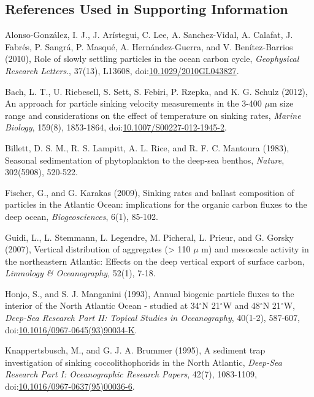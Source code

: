 \begin{singlespace}
\section*{References Used in Supporting Information}
\addtocounter{section}{1}
{\setlength{\parindent}{0pt}
Alonso-Gonz\'{a}lez, I. J., J. Ar\'{i}stegui, C. Lee, A. Sanchez-Vidal, A. Calafat, J. Fabr\'{e}s, P. Sangr\'{a}, P. Masqu\'{e}, A. Hern\'{a}ndez-Guerra, and V. Ben\'{i}tez-Barrios (2010), Role of slowly settling particles in the ocean carbon cycle, \emph{Geophysical Research Letters}., 37(13), L13608, doi:\href{http://dx.doi.org/10.1029/2010GL043827}{10.1029/2010GL043827}.

{\setlength{\parskip}{10pt}

Bach, L. T., U. Riebesell, S. Sett, S. Febiri, P. Rzepka, and K. G. Schulz (2012), An approach for particle sinking velocity measurements in the 3-400 $\mu$m size range and considerations on the effect of temperature on sinking rates, \emph{Marine Biology}, 159(8), 1853-1864, doi:\href{http://dx.doi.org/10.1007/S00227-012-1945-2}{10.1007/S00227-012-1945-2}.

Billett, D. S. M., R. S. Lampitt, A. L. Rice, and R. F. C. Mantoura (1983), Seasonal sedimentation of phytoplankton to the deep-sea benthos, \emph{Nature}, 302(5908), 520-522.

Fischer, G., and G. Karakas (2009), Sinking rates and ballast composition of particles in the Atlantic Ocean: implications for the organic carbon fluxes to the deep ocean, \emph{Biogeosciences}, 6(1), 85-102.

Guidi, L., L. Stemmann, L. Legendre, M. Picheral, L. Prieur, and G. Gorsky (2007), Vertical distribution of aggregates (\textgreater{} 110 $\mu$ m) and mesoscale activity in the northeastern Atlantic: Effects on the deep vertical export of surface carbon, \emph{Limnology \& Oceanography}, 52(1), 7-18.

Honjo, S., and S. J. Manganini (1993), Annual biogenic particle fluxes to the interior of the North Atlantic Ocean - studied at 34$^{\circ}$N 21$^{\circ}$W and 48$^{\circ}$N 21$^{\circ}$W, \emph{Deep-Sea Research Part II: Topical Studies in Oceanography}, 40(1-2), 587-607, doi:\href{http://dx.doi.org/10.1016/0967-0645(93)90034-K}{10.1016/0967-0645(93)90034-K}.

Knappertsbusch, M., and G. J. A. Brummer (1995), A sediment trap investigation of sinking coccolithophorids in the North Atlantic, \emph{Deep-Sea Research Part I: Oceanographic Research Papers}, 42(7), 1083-1109, doi:\href{http://dx.doi.org/10.1016/0967-0637(95)00036-6}{10.1016/0967-0637(95)00036-6}.

}}
\end{singlespace}
